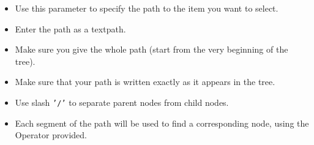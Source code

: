 \begin{itemize}
\item Use this parameter to specify the path to the item you want to select.
\item Enter the path as a textpath.
\item Make sure you give the whole path (start from the very beginning of the tree).
\item Make sure that your path is written exactly as it appears in the tree. 
\item Use slash {\tt '/'} to separate parent nodes from child nodes.
\item Each segment of the path will be used to find a corresponding node, using the Operator provided.
\end{itemize}

    